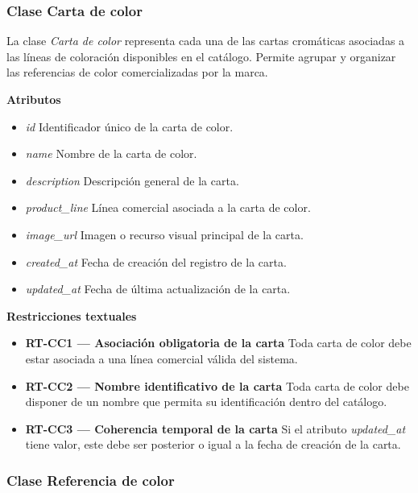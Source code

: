 \subsubsection{Clase Carta de color}

La clase \textit{Carta de color} representa cada una de las cartas cromáticas asociadas a las líneas de coloración disponibles en el catálogo. Permite agrupar y organizar las referencias de color comercializadas por la marca.

\textbf{Atributos}

\begin{itemize}
      \item \textit{id}
            Identificador único de la carta de color.
      \item \textit{name}
            Nombre de la carta de color.
      \item \textit{description}
            Descripción general de la carta.
      \item \textit{product\_line}
            Línea comercial asociada a la carta de color.
      \item \textit{image\_url}
            Imagen o recurso visual principal de la carta.
      \item \textit{created\_at}
            Fecha de creación del registro de la carta.
      \item \textit{updated\_at}
            Fecha de última actualización de la carta.
\end{itemize}

\textbf{Restricciones textuales}

\begin{itemize}
      \item \textbf{RT-CC1 — Asociación obligatoria de la carta}
            Toda carta de color debe estar asociada a una línea comercial válida del sistema.
      \item \textbf{RT-CC2 — Nombre identificativo de la carta}
            Toda carta de color debe disponer de un nombre que permita su identificación dentro del catálogo.
      \item \textbf{RT-CC3 — Coherencia temporal de la carta}
            Si el atributo \textit{updated\_at} tiene valor, este debe ser posterior o igual a la fecha de creación de la carta.
\end{itemize}

\subsubsection{Clase Referencia de color}

